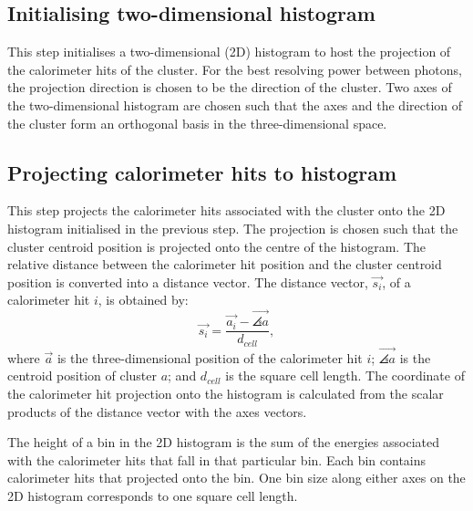 \subsection{Initialising  two-dimensional histogram}

This step initialises a two-dimensional (2D) histogram to host the projection of the calorimeter hits of the cluster. For the best resolving power between photons, the projection direction is chosen to be the direction of the cluster. Two axes of the two-dimensional histogram are chosen such that the axes and the direction of the cluster form an orthogonal basis  in the three-dimensional space.




\subsection{Projecting calorimeter hits to histogram}

This step projects the calorimeter hits associated with the cluster onto the 2D histogram initialised in the previous step. The projection is chosen such that the cluster centroid position is projected onto the centre of the histogram. The relative distance between the calorimeter hit position and the cluster centroid position is converted into a distance vector. The distance vector, $\vec{s_{i}}$, of a calorimeter hit $i$, is obtained by:
\begin{equation}
\vec{s_{i}} = \frac{\vec{a_{i}} -  \vec{\angles{a}}}{d_{cell}},
\end{equation}
where $\vec{a}$ is the three-dimensional position of the calorimeter hit $i$;  $\vec{\angles{a}}$ is the centroid position of cluster $a$; and $d_{cell}$ is the  \ECAL square cell length. The coordinate of the calorimeter hit projection onto the histogram is calculated from the scalar products of the distance vector with the axes vectors.

The height of a bin in the 2D histogram is the sum of the energies associated with the calorimeter hits that fall in that particular bin. Each bin contains calorimeter hits that projected onto the bin. One bin size along either axes on the 2D histogram corresponds to one \ECAL square cell length.


